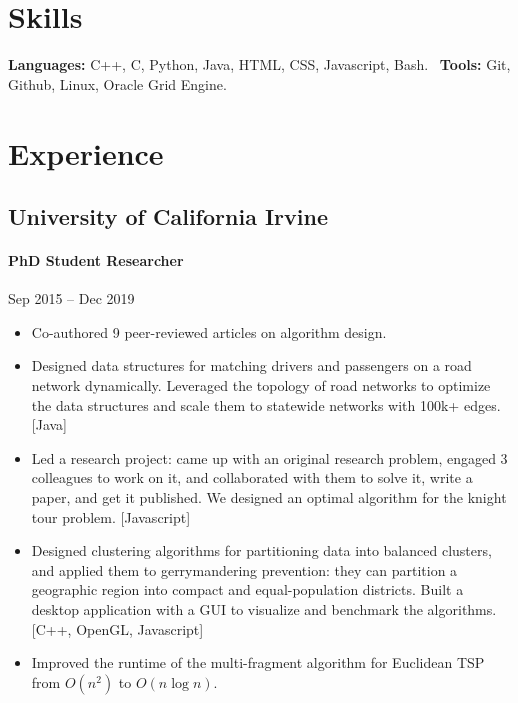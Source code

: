 \documentclass[letterpaper,10pt,oneside]{article}
\begin{document}
\section*{Skills}
\textbf{Languages:} C++, C, Python, Java, HTML, CSS, Javascript, Bash.~
\textbf{Tools:} Git, Github, Linux, Oracle Grid Engine.

\section*{Experience}
\subsection*{University of California Irvine}
\vspace{-3px}
\paragraph*{PhD Student Researcher} \hfill Sep 2015 -- Dec 2019

\vspace{-1px}
\begin{itemize}[leftmargin=15px]
	\item Co-authored 9 peer-reviewed articles on algorithm design.
	\item Designed data structures for matching drivers and passengers on a road network dynamically. Leveraged the topology of road networks to optimize the data structures and scale them to statewide networks with 100k+ edges. [Java]   
	\item Led a research project: came up with an original research problem, engaged 3 colleagues to work on it, and collaborated with them to solve it, write a paper, and get it published. We designed an optimal algorithm for the knight tour problem. [Javascript]
	\item Designed clustering algorithms for partitioning data into balanced clusters, and applied them to gerrymandering prevention: they can partition a geographic region into compact and equal-population districts. Built a desktop application with a GUI to visualize and benchmark the algorithms. [C++, OpenGL, Javascript]
	\item Improved the runtime of the multi-fragment algorithm for Euclidean TSP from $O(n^2)$ to $O(n\log n)$.
\end{itemize}
\end{document}
